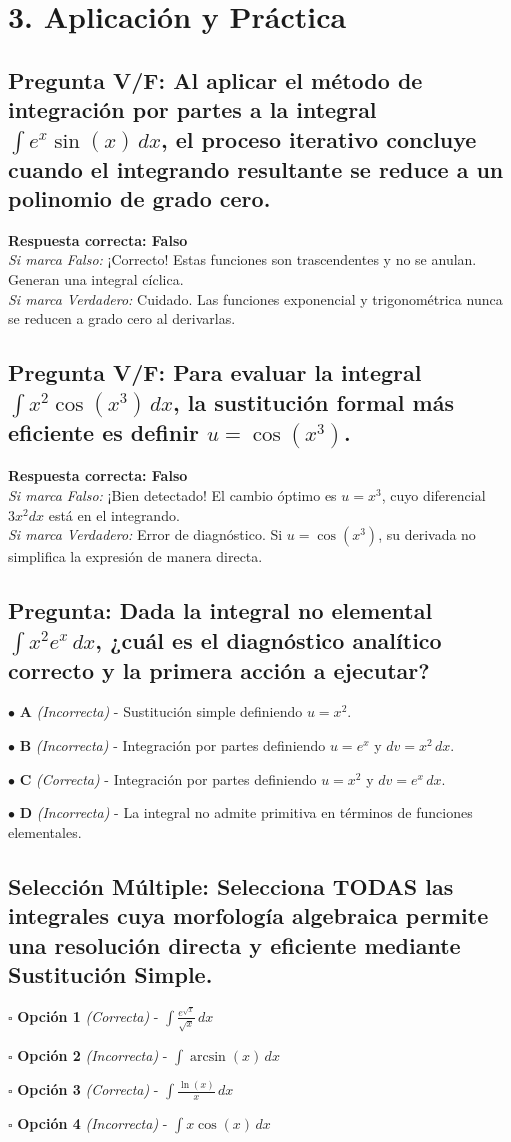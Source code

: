 \documentclass[11pt]{article}
\newenvironment{aplicacion}{\section*{3. Aplicación y Práctica}}{}
\newenvironment{preguntaalternativas}[1]{\subsection*{Pregunta: #1}\par\vspace{0.1cm}}{\vspace{0.3cm}}
\newcommand{\opcion}[3]{\par\noindent $\bullet$ \textbf{#1} \textit{(#2)} - #3\par\vspace{0.15cm}}
\newenvironment{preguntaverdaderofalso}[1]{\subsection*{Pregunta V/F: #1}\par\vspace{0.1cm}}{\vspace{0.3cm}}
\newcommand{\verdaderofalso}[3]{\par\noindent\textbf{Respuesta correcta: #1} \\ \textit{Si marca Falso:} #2 \\ \textit{Si marca Verdadero:} #3\par\vspace{0.15cm}}
\newenvironment{preguntacasillas}[1]{\subsection*{Selección Múltiple: #1}\par\vspace{0.1cm}}{\vspace{0.3cm}}
\newcommand{\casilla}[3]{\par\noindent $\square$ \textbf{#1} \textit{(#2)} - #3\par\vspace{0.15cm}}
\begin{document}
\begin{aplicacion}

  \begin{preguntaverdaderofalso}{Al aplicar el método de integración por partes a la integral $\displaystyle\int e^x \sin(x) \, dx$, el proceso iterativo concluye cuando el integrando resultante se reduce a un polinomio de grado cero.}
    \verdaderofalso{Falso}
    {¡Correcto! Estas funciones son trascendentes y no se anulan. Generan una integral cíclica.}
    {Cuidado. Las funciones exponencial y trigonométrica nunca se reducen a grado cero al derivarlas.}
  \end{preguntaverdaderofalso}

  \begin{preguntaverdaderofalso}{Para evaluar la integral $\displaystyle\int x^2 \cos(x^3) \, dx$, la sustitución formal más eficiente es definir $u = \cos(x^3)$.}
    \verdaderofalso{Falso}
    {¡Bien detectado! El cambio óptimo es $u = x^3$, cuyo diferencial $3x^2 dx$ está en el integrando.}
    {Error de diagnóstico. Si $u=\cos(x^3)$, su derivada no simplifica la expresión de manera directa.}
  \end{preguntaverdaderofalso}

  \begin{preguntaalternativas}{Dada la integral no elemental $\displaystyle\int x^2 e^{x} \, dx$, ¿cuál es el diagnóstico analítico correcto y la primera acción a ejecutar?}
    \opcion{A}{Incorrecta}{Sustitución simple definiendo $u = x^2$.}
    \opcion{B}{Incorrecta}{Integración por partes definiendo $u = e^x$ y $dv = x^2 \, dx$.}
    \opcion{C}{Correcta}{Integración por partes definiendo $u = x^2$ y $dv = e^x \, dx$.}
    \opcion{D}{Incorrecta}{La integral no admite primitiva en términos de funciones elementales.}
  \end{preguntaalternativas}

  \begin{preguntacasillas}{Selecciona TODAS las integrales cuya morfología algebraica permite una resolución directa y eficiente mediante Sustitución Simple.}
    \casilla{Opción 1}{Correcta}{$\displaystyle\int \frac{e^{\sqrt{x}}}{\sqrt{x}} \, dx$}
    \casilla{Opción 2}{Incorrecta}{$\displaystyle\int \arcsin(x) \, dx$}
    \casilla{Opción 3}{Correcta}{$\displaystyle\int \frac{\ln(x)}{x} \, dx$}
    \casilla{Opción 4}{Incorrecta}{$\displaystyle\int x \cos(x) \, dx$}
  \end{preguntacasillas}


\end{aplicacion}
\end{document}

